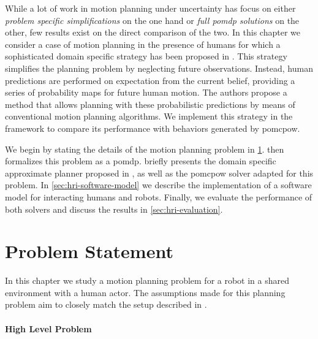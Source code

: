 While a lot of work in motion planning under uncertainty has focus on either
\emph{problem specific simplifications} on the one hand or \emph{full
\ac{pomdp} solutions} on the other, few results exist on the direct comparison
of the two. In this chapter we consider a case of motion planning in the
presence of humans for which a sophisticated domain specific strategy has been
proposed in \cite{fisac2018probabilistically}. This strategy simplifies the
planning problem by neglecting future observations. Instead, human predictions
are performed on expectation from the current belief, providing a series of
probability maps for future human motion. The authors propose a method that
allows planning with these probabilistic predictions by means of conventional
motion planning algorithms. We implement this strategy in the \pomdpsjl
framework to compare its performance with behaviors generated by
\ac{pomcpow}.

We begin by stating the details of the motion planning problem in
\cref{sec:hri-problem-statement}.  then
formalizes this problem as a \ac{pomdp}.  briefly
presents the domain specific approximate planner proposed in
\cite{fisac2018probabilistically}, as well as the \ac{pomcpow} solver adapted
for this problem. In \cref{sec:hri-software-model} we describe the
implementation of a software model for interacting humans and robots. Finally,
we evaluate the performance of both solvers and discuss the results in
\cref{sec:hri-evaluation}.

\section{Problem Statement}\label{sec:hri-problem-statement}

In this chapter we study a motion planning problem for a robot in a shared
environment with a human actor. The assumptions made for this planning problem
aim to closely match the setup described in \cite{fisac2018probabilistically}.

\paragraph{High Level Problem}

